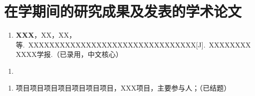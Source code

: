 
\chapter*{在学期间的研究成果及发表的学术论文}

\par

\begin{enumerate}[itemsep = -5pt, left = 0pt]
	\item \textbf{XXX}，XX，XX，等.~XXXXXXXXXXXXXXXXXXXXXXXXXXXXXXXX[J].~XXXXXXXXXXXX学报.（已录用，中文核心）
\end{enumerate}

\vspace*{2cm}
\par
\begin{enumerate}[itemsep = -5pt, left = 0pt]
	\item 
\end{enumerate}

\vspace*{2cm}

\par

\begin{enumerate}[itemsep = -5pt, left = 0pt]
	\item 项目项目项目项目项目项目项目，XXX项目，主要参与人；（已结题）
\end{enumerate}

